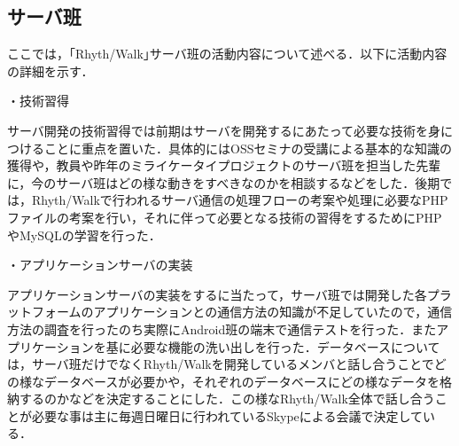 \subsection{サーバ班}
\par
ここでは，｢Rhyth/Walk｣サーバ班の活動内容について述べる．以下に活動内容の詳細を示す．
\par
・技術習得
\par
サーバ開発の技術習得では前期はサーバを開発するにあたって必要な技術を身につけることに重点を置いた．具体的にはOSSセミナの受講による基本的な知識の獲得や，教員や昨年のミライケータイプロジェクトのサーバ班を担当した先輩に，今のサーバ班はどの様な動きをすべきなのかを相談するなどをした．後期では，Rhyth/Walkで行われるサーバ通信の処理フローの考案や処理に必要なPHPファイルの考案を行い，それに伴って必要となる技術の習得をするためにPHPやMySQLの学習を行った．
\par
・アプリケーションサーバの実装
\par
アプリケーションサーバの実装をするに当たって，サーバ班では開発した各プラットフォームのアプリケーションとの通信方法の知識が不足していたので，通信方法の調査を行ったのち実際にAndroid班の端末で通信テストを行った．またアプリケーションを基に必要な機能の洗い出しを行った．データベースについては，サーバ班だけでなくRhyth/Walkを開発しているメンバと話し合うことでどの様なデータベースが必要かや，それぞれのデータベースにどの様なデータを格納するのかなどを決定することにした．この様なRhyth/Walk全体で話し合うことが必要な事は主に毎週日曜日に行われているSkypeによる会議で決定している．
\par
{}
